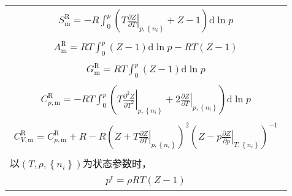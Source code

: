 \documentclass[main.tex]{subfiles}
\begin{document}
\begin{longtable}{m{}}
  \begin{align}S_\text{m}^\text{R}=-R\int_0^p\left(T\left.\frac{\partial Z}{\partial T}\right|_{p,\left\{n_i\right\}}+Z-1\right)\mathrm{d}\ln p\end{align}                                                                                                        \\[-8ex]
  \begin{align}A_\text{m}^\text{R}=RT\int_0^p\left(Z-1\right)\mathrm{d}\ln p-RT\left(Z-1\right)\end{align}                                                                                                                                                        \\ [-8ex]
  \begin{align}G_\text{m}^\text{R}=RT\int_0^p\left(Z-1\right)\mathrm{d}\ln p\end{align}                                                                                                                                                                           \\[-8ex]
  \begin{align}C_{p,\text{m}}^\text{R}  =-RT\int_0^p\left(T\left.\frac{\partial^2 Z}{\partial T^2}\right|_{p,\left\{n_i\right\}}+2\left.\frac{\partial Z}{\partial T}\right|_{p,\left\{n_i\right\}}\right)\mathrm{d}\ln p \end{align}                             \\ [-8ex]
  \begin{align}C_{V,\text{m}}^\text{R}  =C_{p,\text{m}}^\text{R}+R-R\left(Z+T\left.\frac{\partial Z}{\partial T}\right|_{p,\left\{n_i\right\}}\right)^2\left(Z-p\left.\frac{\partial Z}{\partial p}\right|_{T,\left\{n_i\right\}}\right)^{-1}\end{align}          \\
  以$\left(T,\rho,\left\{n_i\right\}\right)$为状态参数时，                                                                                                                                                                                                                \\ [-4ex]
  \begin{align}
    p^\text{r}               =\rho RT\left(Z-1\right)\end{align}                                                                                                                                                                                                    \\ [-8ex]

\end{longtable}
\end{document}
